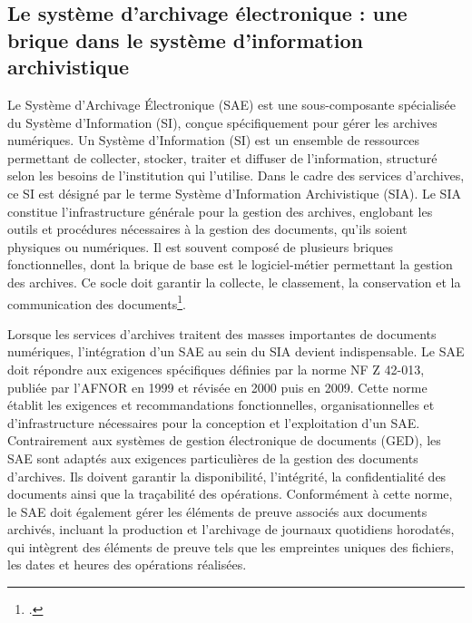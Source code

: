 \subsection*{Le système d'archivage électronique : une brique dans le système d'information archivistique}

Le Système d’Archivage Électronique (SAE) est une sous-composante spécialisée du Système d’Information (SI), conçue spécifiquement pour gérer les archives numériques. Un Système d’Information (SI) est un ensemble de ressources permettant de collecter, stocker, traiter et diffuser de l’information, structuré selon les besoins de l’institution qui l’utilise. Dans le cadre des services d’archives, ce SI est désigné par le terme Système d’Information Archivistique (SIA). Le SIA constitue l’infrastructure générale pour la gestion des archives, englobant les outils et procédures nécessaires à la gestion des documents, qu'ils soient physiques ou numériques. Il est souvent composé de plusieurs briques fonctionnelles, dont la brique de base est le logiciel-métier permettant la gestion des archives. Ce socle doit garantir la collecte, le classement, la conservation et la communication des documents\footcite{bothSystemeInformationArchivistique2020}.

Lorsque les services d’archives traitent des masses importantes de documents numériques, l'intégration d'un SAE au sein du SIA devient indispensable. Le SAE doit répondre aux exigences spécifiques définies par la norme NF Z 42-013, publiée par l'AFNOR en 1999 et révisée en 2000 puis en 2009. Cette norme établit les exigences et recommandations fonctionnelles, organisationnelles et d’infrastructure nécessaires pour la conception et l’exploitation d’un SAE. Contrairement aux systèmes de gestion électronique de documents (GED), les SAE sont adaptés aux exigences particulières de la gestion des documents d’archives. Ils doivent garantir la disponibilité, l’intégrité, la confidentialité des documents ainsi que la traçabilité des opérations. Conformément à cette norme, le SAE doit également gérer les éléments de preuve associés aux documents archivés, incluant la production et l’archivage de journaux quotidiens horodatés, qui intègrent des éléments de preuve tels que les empreintes uniques des fichiers, les dates et heures des opérations réalisées.

